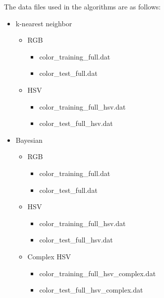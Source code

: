 \documentclass[twoside]{IEEEtran}
\begin{document}
The data files used in the algorithms are as follows:
\begin{itemize}
    \item k-nearest neighbor
          \begin{itemize}
              \item RGB
                    \begin{itemize}
                        \item color\_training\_full.dat
                        \item color\_test\_full.dat
                    \end{itemize}
              \item HSV
                    \begin{itemize}
                        \item color\_training\_full\_hsv.dat
                        \item color\_test\_full\_hsv.dat
                    \end{itemize}
          \end{itemize}

    \item Bayesian
          \begin{itemize}
              \item RGB
                    \begin{itemize}
                        \item color\_training\_full.dat
                        \item color\_test\_full.dat
                    \end{itemize}
              \item HSV
                    \begin{itemize}
                        \item color\_training\_full\_hsv.dat
                        \item color\_test\_full\_hsv.dat
                    \end{itemize}
              \item Complex HSV
                    \begin{itemize}
                        \item color\_training\_full\_hsv\_complex.dat
                        \item color\_test\_full\_hsv\_complex.dat
                    \end{itemize}
          \end{itemize}


\end{itemize}
\end{document}
